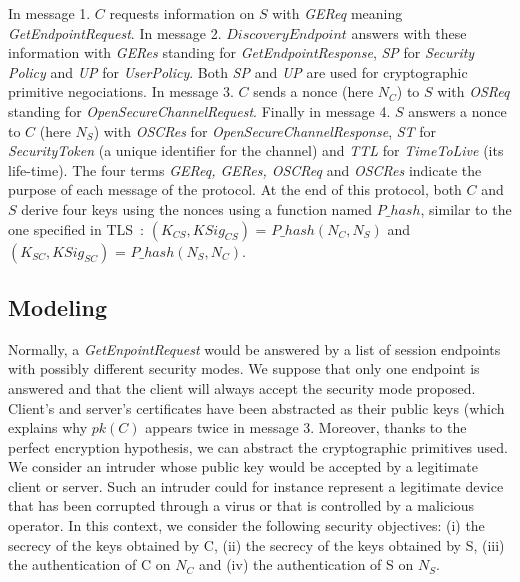 In message 1. $C$ requests information on $S$ with {\em GEReq} meaning
{\em GetEndpointRequest}.
In message 2. $DiscoveryEndpoint$ answers with these information with
{\em GERes} standing for {\em GetEndpointResponse}, {\em SP} for
{\em Security Policy} and {\em UP} for {\em UserPolicy}.
Both {\em SP} and {\em UP} are used for cryptographic primitive negociations.
In message 3. $C$ sends a nonce (here $N_{C}$) to $S$ with {\em OSReq}
standing for {\em OpenSecureChannelRequest}.
Finally in message 4. $S$ answers a nonce to $C$ (here $N_{S}$) with
{\em OSCRes} for {\em OpenSecureChannelResponse}, {\em ST} for
{\em SecurityToken} (a unique identifier for the channel) and {\em TTL} for
{\em TimeToLive} (its life-time).
The four terms {\em GEReq, GERes, OSCReq} and {\em OSCRes} indicate the purpose
of each message of the protocol.
At the end of this protocol, both $C$ and $S$ derive four keys using the nonces
using a function named $P\_hash$, similar to the one specified in
TLS~\cite{DR08}: $(K_{CS}, KSig_{CS})$ = $P\_hash(N_{C}, N_{S})$ and
$(K_{SC}, KSig_{SC})$ = $P\_hash(N_{S}, N_{C})$.

\subsection{Modeling}

Normally, a {\em GetEnpointRequest} would be answered by a list of
session endpoints with possibly different security modes. We suppose
that only one endpoint is answered and that the client will always
accept the security mode proposed.
Client's and server's certificates have been abstracted as their public
keys (which explains why $pk(C)$ appears twice in message 3.
Moreover, thanks to the perfect
encryption hypothesis, we can abstract the cryptographic primitives
used.  We consider an intruder whose public key would be accepted by a
legitimate client or server.  Such an intruder could for instance
represent a legitimate device that has been corrupted through a virus
or that is controlled by a malicious operator.
In this context, we consider the following security objectives: (i)
the secrecy of the keys obtained by C, (ii) the secrecy of the keys obtained
by S, (iii) the authentication of C on $N_{C}$ and (iv) the authentication of S
on $N_{S}$.


